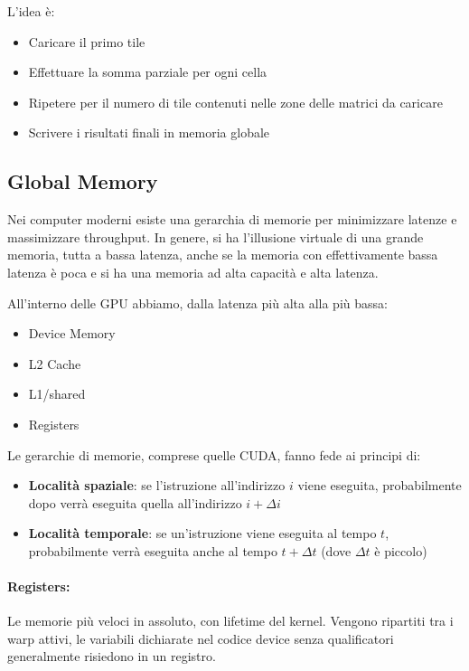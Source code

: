 L'idea è: 
\begin{itemize}
	\item Caricare il primo tile
	
	\item Effettuare la somma parziale per ogni cella
	
	 \item Ripetere per il numero di tile contenuti nelle zone delle matrici da caricare
	 
	 \item Scrivere i risultati finali in memoria globale
\end{itemize}

\subsection{Global Memory}

Nei computer moderni esiste una gerarchia di memorie per minimizzare latenze e massimizzare throughput. In genere, si ha l'illusione virtuale di una grande memoria, tutta a bassa latenza, anche se la memoria con effettivamente bassa latenza è poca e si ha una memoria ad alta capacità e alta latenza.

All'interno delle GPU abbiamo, dalla latenza più alta alla più bassa: 
\begin{itemize}
	\item Device Memory
	
	\item L2 Cache
	
	\item L1/shared
	
	\item Registers
\end{itemize}

Le gerarchie di memorie, comprese quelle CUDA, fanno fede ai principi di: 
\begin{itemize}
	\item \textbf{Località spaziale}: se l'istruzione all'indirizzo $i$ viene eseguita, probabilmente dopo verrà eseguita quella all'indirizzo $i + \Delta i$
	
	\item \textbf{Località temporale}: se un'istruzione viene eseguita al tempo $t$, probabilmente verrà eseguita anche al tempo $t + \Delta t$ (dove $\Delta t$ è piccolo)
\end{itemize}

\paragraph{Registers:} Le memorie più veloci in assoluto, con lifetime del kernel. Vengono ripartiti tra i warp attivi, le variabili dichiarate nel codice device senza qualificatori generalmente risiedono in un registro. 

